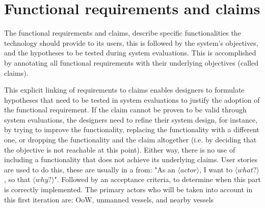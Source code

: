 \section{Functional requirements and claims}
The functional requirements and claims, describe specific functionalities the technology should provide to its users, this is followed by the system’s objectives, and the hypotheses to be tested during system evaluations. This is accomplished by annotating all functional requirements with their underlying objectives (called claims).

This explicit linking of requirements to claims enables designers to formulate hypotheses that need to be tested in system evaluations to justify the adoption of the functional requirement. If the claim cannot be proven to be valid through system evaluations, the designers need to refine their system design, for instance, by trying to improve the functionality, replacing the functionality with a different one, or dropping the functionality and the claim altogether (i.e. by deciding that the objective is not reachable at this point). Either way, there is no use of including a functionality that does not achieve its underlying claims. User stories are used to do this, these are usually in a from: "As an $\langle actor \rangle$, I want to $\langle what? \rangle$, so that $\langle why? \rangle$". Followed by an acceptance criteria, to determine when this part is correctly implemented.
The primary actors who will be taken into account in this first iteration are: \acf{OoW}, unmanned vessels, and nearby vessels

